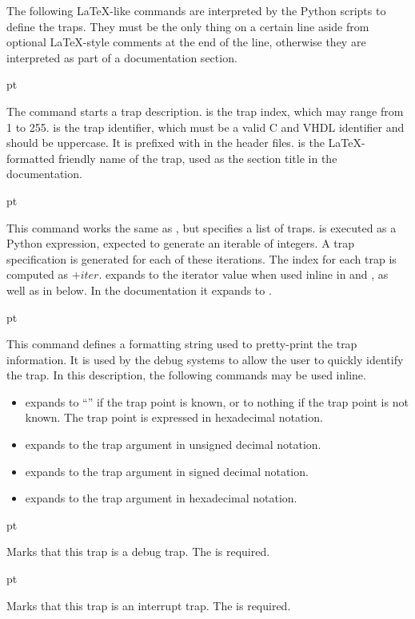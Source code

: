 The following LaTeX-like commands are interpreted by the Python scripts to 
define the traps. They must be the only thing on a certain line aside from 
optional LaTeX-style comments at the end of the line, otherwise they are 
interpreted as part of a documentation section.

 pt

\noindent The command starts a trap description.  is the trap 
index, which may range from 1 to 255.  is the trap identifier, 
which must be a valid C and VHDL identifier and should be uppercase. It is 
prefixed with  in the header files.  is the 
LaTeX-formatted friendly name of the trap, used as the section title in the 
documentation.

 pt

\noindent This command works the same as \code{\trap}, but specifies a list of 
traps.  is executed as a Python expression, expected to 
generate an iterable of integers. A trap specification is generated for each of 
these iterations. The index for each trap is computed as $ + 
iter$. \code{\n{}} expands to the iterator value when used inline in 
 and , as well as in  
below. In the documentation it expands to .

 pt

\noindent This command defines a formatting string used to pretty-print the trap 
information. It is used by the debug systems to allow the user to quickly 
identify the trap. In this description, the following commands may be used 
inline.

\begin{itemize}

\item \code{\at{}} expands to ``'' if the trap point is 
known, or to nothing if the trap point is not known. The trap point is expressed 
in hexadecimal notation.

\item {} expands to the trap argument in unsigned decimal notation.

\item {} expands to the trap argument in signed decimal notation.

\item {} expands to the trap argument in hexadecimal notation.

\end{itemize}

 pt
\codehead{\debug{}}

\noindent Marks that this trap is a debug trap. The \code{{}} is required.

 pt
\codehead{\interrupt{}}

\noindent Marks that this trap is an interrupt trap. The \code{{}} is required.

